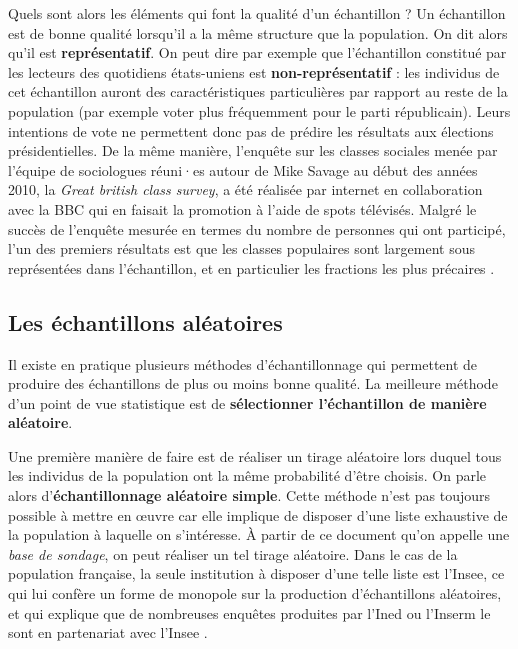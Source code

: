 \documentclass[
]{book}
\begin{document}
Quels sont alors les éléments qui font la qualité d'un échantillon ? Un échantillon est de bonne qualité lorsqu'il a la même structure que la population. On dit alors qu'il est \textbf{représentatif}. On peut dire par exemple que l'échantillon constitué par les lecteurs des quotidiens états-uniens est \textbf{non-représentatif} : les individus de cet échantillon auront des caractéristiques particulières par rapport au reste de la population (par exemple voter plus fréquemment pour le parti républicain). Leurs intentions de vote ne permettent donc pas de prédire les résultats aux élections présidentielles. De la même manière, l'enquête sur les classes sociales menée par l'équipe de sociologues réuni·es autour de Mike Savage au début des années 2010, la \emph{Great british class survey}, a été réalisée par internet en collaboration avec la BBC qui en faisait la promotion à l'aide de spots télévisés. Malgré le succès de l'enquête mesurée en termes du nombre de personnes qui ont participé, l'un des premiers résultats est que les classes populaires sont largement sous représentées dans l'échantillon, et en particulier les fractions les plus précaires \citep{savage2013}.

\hypertarget{les-uxe9chantillons-aluxe9atoires}{%
\subsection{Les échantillons aléatoires}\label{les-uxe9chantillons-aluxe9atoires}}

Il existe en pratique plusieurs méthodes d'échantillonnage qui permettent de produire des échantillons de plus ou moins bonne qualité. La meilleure méthode d'un point de vue statistique est de \textbf{sélectionner l'échantillon de manière aléatoire}.

Une première manière de faire est de réaliser un tirage aléatoire lors duquel tous les individus de la population ont la même probabilité d'être choisis. On parle alors d'\textbf{échantillonnage aléatoire simple}. Cette méthode n'est pas toujours possible à mettre en œuvre car elle implique de disposer d'une liste exhaustive de la population à laquelle on s'intéresse. À partir de ce document qu'on appelle une \emph{base de sondage}, on peut réaliser un tel tirage aléatoire. Dans le cas de la population française, la seule institution à disposer d'une telle liste est l'Insee, ce qui lui confère un forme de monopole sur la production d'échantillons aléatoires, et qui explique que de nombreuses enquêtes produites par l'Ined ou l'Inserm le sont en partenariat avec l'Insee \citep[p.66]{bugeja-bloch2021}.
\end{document}
